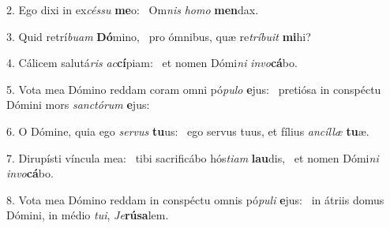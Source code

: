 2. Ego dixi in ex\textit{cés}\textit{su} \textbf{me}o: \ast\  Om\textit{nis} \textit{ho}\textit{mo} \textbf{men}dax.\

3. Quid retrí\textit{bu}\textit{am} \textbf{Dó}mino, \ast\  pro ómnibus, quæ re\textit{trí}\textit{bu}\textit{it} \textbf{mi}hi?\

4. Cálicem salutá\textit{ris} \textit{ac}\textbf{cí}piam: \ast\  et nomen Dómi\textit{ni} \textit{in}\textit{vo}\textbf{cá}bo.\

5. Vota mea Dómino reddam coram omni pó\textit{pu}\textit{lo} \textbf{e}jus: \ast\  pretiósa in conspéctu Dómini mors \textit{sanc}\textit{tó}\textit{rum} \textbf{e}jus:\

6. O Dómine, quia ego \textit{ser}\textit{vus} \textbf{tu}us: \ast\  ego servus tuus, et fílius \textit{an}\textit{cíl}\textit{læ} \textbf{tu}æ.\

7. Dirupísti víncula mea: \dag\  tibi sacrificábo hós\textit{ti}\textit{am} \textbf{lau}dis, \ast\  et nomen Dómi\textit{ni} \textit{in}\textit{vo}\textbf{cá}bo.\

8. Vota mea Dómino reddam in conspéctu omnis pó\textit{pu}\textit{li} \textbf{e}jus: \ast\  in átriis domus Dómini, in médio \textit{tu}\textit{i}, \textit{Je}\textbf{rú}\textbf{sa}lem.\

